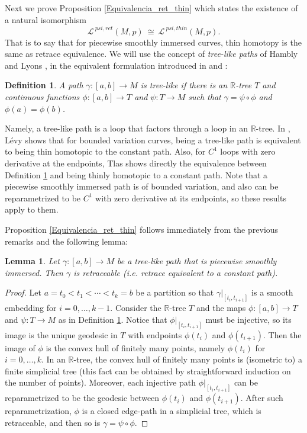 \documentclass{amsart}
\newcommand{\R}{{\mathbb R}}
\newtheorem{lemma}[theorem]{Lemma}
\newtheorem{definition}[theorem]{Definition}
\begin{document}
Next we prove Proposition \ref{Equivalencia_ret_thin} which states the existence of a natural isomorphism
$$\mathcal{L}^{\ psi,ret}(M,p)\ \cong\ \mathcal{L}^{\ psi,thin}(M,p).$$
That is to say that for piecewise smoothly immersed curves, thin homotopy is the same as retrace equivalence. We will use the concept of {\em tree-like paths} of Hambly and Lyons \cite{Lyons2prima}, in the equivalent formulation introduced in \cite{Lyons2} and \cite{Lyons4}:

\begin{definition} \label{tree-like} A path $\gamma:[a,b]\to M$ is tree-like if there is an $\R$-tree $T$ and continuous functions $\phi:[a,b]\to T$ and $\psi:T\to M$ such that $\gamma=\psi\circ\phi$ and $\phi(a)=\phi(b)$.
\end{definition} 

Namely, a tree-like path is a loop that factors through a loop in an $\R$-tree. In \cite{Levy}, L\'evy shows that for bounded variation curves, being a tree-like path is equivalent to being thin homotopic to the constant path. Also, for $C^1$ loops with zero derivative at the endpoints, Tlas \cite{Tlas} shows directly the equivalence between Definition \ref{tree-like} and being thinly homotopic to a constant path. Note that a piecewise smoothly immersed path is of bounded variation, and also can be reparametrized to be $C^1$ with zero derivative at its endpoints, so these results apply to them. 

Proposition \ref{Equivalencia_ret_thin} follows immediately from the previous remarks and the following lemma:

\begin{lemma} Let $\gamma:[a,b]\to M$ be a tree-like path that is piecewise smoothly immersed. Then $\gamma$ is retraceable (i.e. retrace equivalent to a constant path). 
\end{lemma}

\begin{proof}
Let $a=t_0<t_1<\cdots<t_k=b$ be a partition so that $\gamma|_{[t_i,t_{i+1}]}$ is a smooth embedding for $i=0,\ldots,k-1$. Consider the $\R$-tree $T$ and the maps $\phi:[a,b]\to T$ and $\psi:T\to M$ as in Definition \ref{tree-like}. Notice that $\phi|_{[t_i,t_{i+1}]}$ must be injective, so its image is the unique geodesic in $T$ with endpoints $\phi(t_i)$ and $\phi(t_{i+1})$. Then the image of $\phi$ is the convex hull of finitely many points, namely $\phi(t_i)$ for $i=0,\ldots,k$. In an $\R$-tree, the convex hull of finitely many points is (isometric to) a finite simplicial tree (this fact can be obtained by straightforward induction on the number of points). Moreover, each injective path $\phi|_{[t_i,t_{i+1}]}$ can be reparametrized to be the geodesic between $\phi(t_i)$ and $\phi(t_{i+1})$. After such reparametrization, $\phi$ is a closed edge-path in a simplicial tree, which is retraceable, and then so is $\gamma=\psi\circ\phi$.   

\end{proof}
\end{document}
